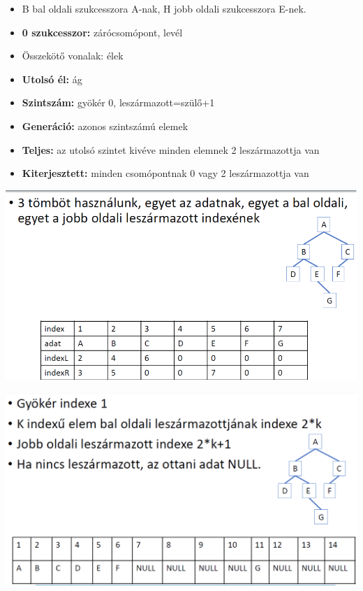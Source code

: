 \documentclass[11pt,a4paper]{article}
\begin{document}
\begin{tcolorbox}[colback=blue!5!white,colframe=blue!50!black,title= 23. Ismertesse a bináris fák szerkezetét és tárolási lehetőségeit számítógépen!]
\begin{itemize}
                    \item B bal oldali szukcesszora A-nak, H jobb oldali szukcesszora E-nek.
                    \item \textbf{0 szukcesszor:} zárócsomópont, levél
                    \item Összekötő vonalak: élek
                    \item \textbf{Utolsó él:} ág
                    \item \textbf{Szintszám:} gyökér 0, leszármazott=szülő+1
                    \item \textbf{Generáció:} azonos szintszámú elemek
                    \item \textbf{Teljes:} az utolsó szintet kivéve minden elemnek 2 leszármazottja van
                    \item \textbf{Kiterjesztett:} minden csomópontnak 0 vagy 2 leszármazottja van
                \end{itemize}
                \begin{center}
                    \includegraphics[scale = 0.3]{23_2.png}
                \end{center}
                \begin{center}
                    \includegraphics[scale = 0.25]{23_3.png}

\end{center}
\end{tcolorbox}
\end{document}
